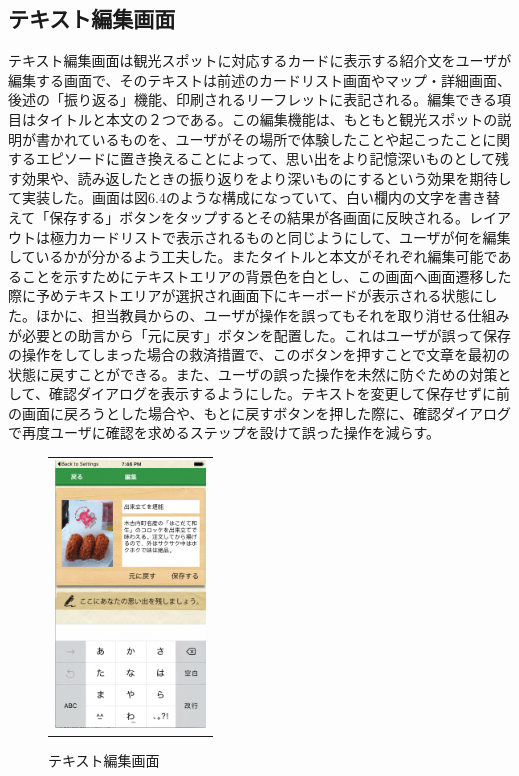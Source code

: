 \subsection{テキスト編集画面}
テキスト編集画面は観光スポットに対応するカードに表示する紹介文をユーザが編集する画面で、そのテキストは前述のカードリスト画面やマップ・詳細画面、後述の「振り返る」機能、印刷されるリーフレットに表記される。編集できる項目はタイトルと本文の２つである。この編集機能は、もともと観光スポットの説明が書かれているものを、ユーザがその場所で体験したことや起こったことに関するエピソードに置き換えることによって、思い出をより記憶深いものとして残す効果や、読み返したときの振り返りをより深いものにするという効果を期待して実装した。画面は図6.4のような構成になっていて、白い欄内の文字を書き替えて「保存する」ボタンをタップするとその結果が各画面に反映される。レイアウトは極力カードリストで表示されるものと同じようにして、ユーザが何を編集しているかが分かるよう工夫した。またタイトルと本文がそれぞれ編集可能であることを示すためにテキストエリアの背景色を白とし、この画面へ画面遷移した際に予めテキストエリアが選択され画面下にキーボードが表示される状態にした。ほかに、担当教員からの、ユーザが操作を誤ってもそれを取り消せる仕組みが必要との助言から「元に戻す」ボタンを配置した。これはユーザが誤って保存の操作をしてしまった場合の救済措置で、このボタンを押すことで文章を最初の状態に戻すことができる。また、ユーザの誤った操作を未然に防ぐための対策として、確認ダイアログを表示するようにした。テキストを変更して保存せずに前の画面に戻ろうとした場合や、もとに戻すボタンを押した際に、確認ダイアログで再度ユーザに確認を求めるステップを設けて誤った操作を減らす。
\newpage

\begin{figure}[htbp]
  \begin{center}
    \begin{tabular}{c}

      \begin{minipage}{0.33\hsize}
        \begin{center}
\includegraphics[width=4cm, bb=0 0 303 573]{kiko_edit.png}
        \end{center}
      \end{minipage}

    \end{tabular}
    \caption{テキスト編集画面}
    \label{fig:lena}
  \end{center}
\end{figure}

